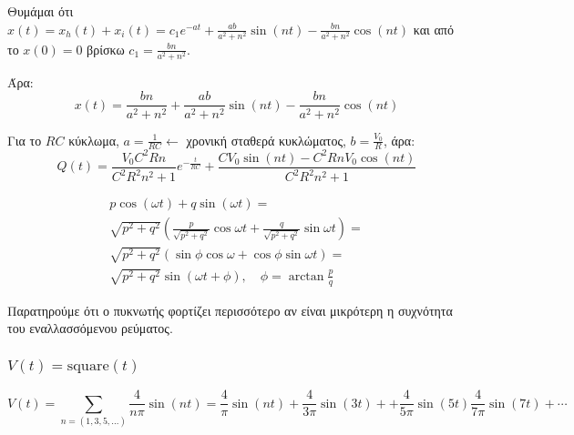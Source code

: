 \documentclass[11pt,a4paper,titlepage,draft]{article}
\begin{document}
Θυμάμαι ότι \(x(t) = x_h(t)+x_i(t) = c_1e^{-at} + \frac{ab}{a^2+n^2} \sin (nt) -  \frac{bn}{a^2+n^2} \cos (nt)\) και από το \(x(0)=0\) βρίσκω \(c_1 = \frac{bn}{a^2+n^2}\).

Άρα:
\[
x(t) = \frac{bn}{a^2+n^2} + \frac{ab}{a^2+n^2} \sin (nt) -  \frac{bn}{a^2+n^2} \cos (nt)
\]

Για το \(RC\) κύκλωμα, \(a=\frac{1}{RC} \leftarrow \) χρονική σταθερά κυκλώματος, \(b=\frac{V_0}{R}\), άρα:
\[
Q(t) = \frac{V_0C^2Rn}{C^2R^2n^2+1}e^{-\frac{t}{RC}} + \frac{CV_0\sin (nt) - C^2RnV_0 \cos (nt)}{C^2R^2n^2+1}
\]

\begin{attnbox}{}
\begin{align*}
p \cos (\omega t) + q \sin (\omega t) = \\
\sqrt{p^2+q^2} \left( \frac{p}{\sqrt{p^2+q^2}} \cos \omega t+ \frac{q}{\sqrt{p^2+q^2}} \sin \omega t \right) = \\
\sqrt{p^2+q^2} \left ( \sin \phi \cos \omega + \cos \phi \sin \omega t \right) = \\
\sqrt{p^2+q^2} \sin ( \omega t + \phi ), \quad \phi = \arctan \frac{p}{q}
\end{align*}
\end{attnbox}

Παρατηρούμε ότι ο πυκνωτής φορτίζει περισσότερο αν είναι μικρότερη η συχνότητα του εναλλασσόμενου ρεύματος.

\pgfplotsset{width=0.8\textwidth}

\subsubsection{\(V(t) = \mathrm{square}(t)\)}

\[
V(t)= \sum _{n = (1,3,5,\dots)} \frac{4}{n \pi} \sin (n t) =
\frac{4}{ \pi} \sin (n t) + \frac{4}{3 \pi} \sin (3 t) +
+ \frac{4}{5 \pi} \sin (5 t) \frac{4}{7 \pi} \sin (7 t) + \cdots
\]
\end{document}
